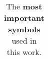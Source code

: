 \begin{table}[h]
\begin{tabular}{@{}lll@{}}
%
%
                   \bottomrule
\end{tabular}
\caption{\textmd{The \textbf{most important symbols} used in this work.}}
\label{tab:symbols}
\end{table}
